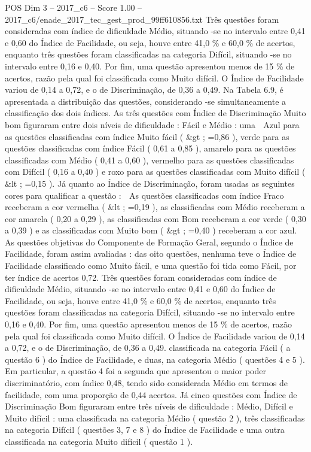 \begin{textsample}{POS Dim 3 – 2017\_c6 – Score 1.00 – 2017\_c6/enade\_2017\_tec\_gest\_prod\_99ff610856.txt}
Três questões foram consideradas com índice de dificuldade Médio, situando -se no intervalo entre 0,41 e 0,60 do Índice de Facilidade, ou seja, houve entre 41,0 \% e 60,0 \% de acertos, enquanto três questões foram classificadas na categoria Difícil, situando -se no intervalo entre 0,16 e 0,40.
Por fim, uma questão apresentou menos de 15 \% de acertos, razão pela qual foi classificada como Muito difícil.
O Índice de Facilidade variou de 0,14 a 0,72, e o de Discriminação, de 0,36 a 0,49.
Na Tabela 6.9, é apresentada a distribuição das questões, considerando -se simultaneamente a classificação dos dois índices.
As três questões com Índice de Discriminação Muito bom figuraram entre dois níveis de dificuldade : Fácil e Médio : uma  Azul para as questões classificadas com índice Muito fácil ( \&gt ; =0,86 ), verde para as questões classificadas com índice Fácil ( 0,61 a 0,85 ), amarelo para as questões classificadas com Médio ( 0,41 a 0,60 ), vermelho para as questões classificadas com Difícil ( 0,16 a 0,40 ) e roxo para as questões classificadas com Muito difícil ( \&lt ; =0,15 ).
Já quanto ao Índice de Discriminação, foram usadas as seguintes cores para qualificar a questão :  As questões classificadas com índice Fraco receberam a cor vermelha ( \&lt ; =0,19 ), as classificadas com Médio receberam a cor amarela ( 0,20 a 0,29 ), as classificadas com Bom receberam a cor verde ( 0,30 a 0,39 ) e as classificadas com Muito bom ( \&gt ; =0,40 ) receberam a cor azul.
As questões objetivas do Componente de Formação Geral, segundo o Índice de Facilidade, foram assim avaliadas : das oito questões, nenhuma teve o Índice de Facilidade classificado como Muito fácil, e uma questão foi tida como Fácil, por ter índice de acertos 0,72.
Três questões foram consideradas com índice de dificuldade Médio, situando -se no intervalo entre 0,41 e 0,60 do Índice de Facilidade, ou seja, houve entre 41,0 \% e 60,0 \% de acertos, enquanto três questões foram classificadas na categoria Difícil, situando -se no intervalo entre 0,16 e 0,40.
Por fim, uma questão apresentou menos de 15 \% de acertos, razão pela qual foi classificada como Muito difícil.
O Índice de Facilidade variou de 0,14 a 0,72, e o de Discriminação, de 0,36 a 0,49. classificada na categoria Fácil ( a questão 6 ) do Índice de Facilidade, e duas, na categoria Médio ( questões 4 e 5 ).
Em particular, a questão 4 foi a segunda que apresentou o maior poder discriminatório, com índice 0,48, tendo sido considerada Médio em termos de facilidade, com uma proporção de 0,44 acertos.
Já cinco questões com Índice de Discriminação Bom figuraram entre três níveis de dificuldade : Médio, Difícil e Muito difícil : uma classificada na categoria Médio ( questão 2 ), três classificadas na categoria Difícil ( questões 3, 7 e 8 ) do Índice de Facilidade e uma outra classificada na categoria Muito difícil ( questão 1 ).

\end{textsample}
